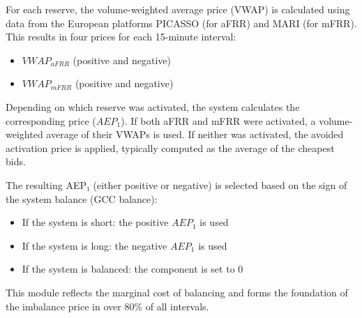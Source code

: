 \documentclass[class=scrbook, crop=false]{standalone}
\begin{document}
For each reserve, the volume-weighted average price (VWAP) is calculated using data from the European platforms PICASSO (for aFRR) and MARI (for mFRR).
This results in four prices for each 15-minute interval:
\begin{itemize}
\item $VWAP_{aFRR}$ (positive and negative)
\item $VWAP_{mFRR}$ (positive and negative)
\end{itemize}

Depending on which reserve was activated, the system calculates the corresponding price ($AEP_1$). If both aFRR and mFRR were activated, a volume-weighted average of their VWAPs is used.
If neither was activated, the avoided activation price is applied, typically computed as the average of the cheapest bids.

The resulting AEP₁ (either positive or negative) is selected based on the sign of the system balance (GCC balance):
\begin{itemize}
\item If the system is short: the positive $AEP_1$ is used
\item If the system is long: the negative $AEP_1$ is used
\item If the system is balanced: the component is set to 0
\end{itemize}
This module reflects the marginal cost of balancing and forms the foundation of the imbalance price in over 80\% of all intervals.





\end{document}
